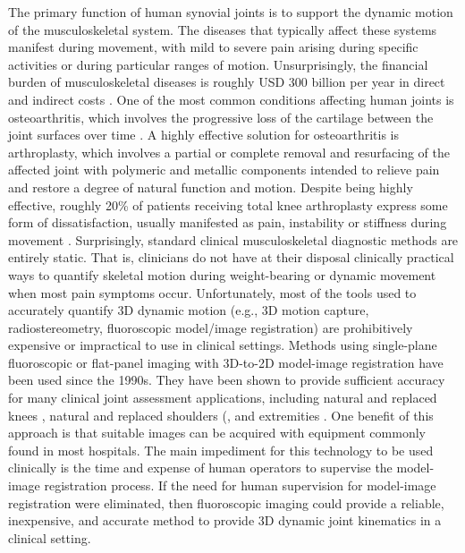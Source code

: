 The primary function of human synovial joints is to support the dynamic motion of the musculoskeletal system. The diseases that typically affect these systems manifest during movement, with mild to severe pain arising during specific activities or during particular ranges of motion. Unsurprisingly, the financial burden of musculoskeletal diseases is roughly USD 300 billion per year in direct and indirect costs \cite{BMUSBurdenMusculoskeletal}. One of the most common conditions affecting human joints is osteoarthritis, which involves the progressive loss of the cartilage between the joint surfaces over time \cite{sharmaOsteoarthritisCompanionRheumatology2007}. A highly effective solution for osteoarthritis is arthroplasty, which involves a partial or complete removal and resurfacing of the affected joint with polymeric and metallic components intended to relieve pain and restore a degree of natural function and motion. Despite being highly effective, roughly 20\% of patients receiving total knee arthroplasty express some form of dissatisfaction, usually manifested as pain, instability or stiffness during movement \cite{bakerRolePainFunction2007,scottPredictingDissatisfactionFollowing2010, bournePatientSatisfactionTotal2010}. Surprisingly, standard clinical musculoskeletal diagnostic methods are entirely static. That is, clinicians do not have at their disposal clinically practical ways to quantify skeletal motion during weight-bearing or dynamic movement when most pain symptoms occur. Unfortunately, most of the tools used to accurately quantify 3D dynamic motion (e.g., 3D motion capture, radiostereometry, fluoroscopic model/image registration) are prohibitively expensive or impractical to use in clinical settings. Methods using single-plane fluoroscopic or flat-panel imaging with 3D-to-2D model-image registration have been used since the 1990s. They have been shown to provide sufficient accuracy for many clinical  joint assessment applications, including natural and replaced knees \cite{banksAccurateMeasurementThreedimensional1996, banksVivoKinematicsCruciateretaining1997, mahfouzRobustMethodRegistration2003, zuffiModelbasedMethodReconstruction1999}, natural and replaced shoulders (\cite{matsukiVivo3DAnalysis2014, matsukiDynamicVivoGlenohumeral2012, zhuAccuracyRepeatabilityAutomatic2012, matsukiVivo3dimensionalAnalysis2011, kijimaVivo3dimensionalAnalysis2015}, and extremities \cite{yamaguchiAnkleSubtalarKinematics2009, listThreeDimensionalKinematicsUnconstrained2012, cenniFunctionalPerformanceTotal2013, cenniKinematicsThreeComponents2012, tersi3DElbowKinematics2009}. One benefit of this approach is that suitable images can be acquired with equipment commonly found in most hospitals. The main impediment for this technology to be used clinically is the time and expense of human operators to supervise the model-image registration process. If the need for human supervision for model-image registration were eliminated, then fluoroscopic imaging could provide a reliable, inexpensive, and accurate method to provide 3D dynamic joint kinematics in a clinical setting.
